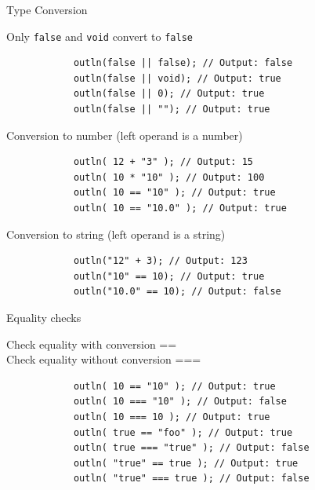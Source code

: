 \documentclass[ucs,9pt]{beamer}
\begin{document}
\begin{frame}[fragile]{Type Conversion}
	\begin{block}{Only \lstinline!false!  and \lstinline!void!  convert to \lstinline!false! }
		\begin{lstlisting}
			outln(false || false); // Output: false
			outln(false || void); // Output: true
			outln(false || 0); // Output: true
			outln(false || ""); // Output: true
		\end{lstlisting}
	\end{block}
	\pause
	\begin{block}{Conversion to number (left operand is a number)}
		\begin{lstlisting}
			outln( 12 + "3" ); // Output: 15
			outln( 10 * "10" ); // Output: 100
			outln( 10 == "10" ); // Output: true
			outln( 10 == "10.0" ); // Output: true
		\end{lstlisting}
	\end{block}
	\pause
	\begin{block}{Conversion to string (left operand is a string)}
		\begin{lstlisting}
			outln("12" + 3); // Output: 123
			outln("10" == 10); // Output: true
			outln("10.0" == 10); // Output: false
		\end{lstlisting}
	\end{block}
\end{frame}

\begin{frame}[fragile]{Equality checks}
		\begin{block}{Check equality with conversion == \\
		Check equality without conversion === }
		\begin{lstlisting}
			outln( 10 == "10" ); // Output: true
			outln( 10 === "10" ); // Output: false
			outln( 10 === 10 ); // Output: true
			outln( true == "foo" ); // Output: true
			outln( true === "true" ); // Output: false
			outln( "true" == true ); // Output: true
			outln( "true" === true ); // Output: false
		\end{lstlisting}
	\end{block}
\end{frame}
\end{document}
